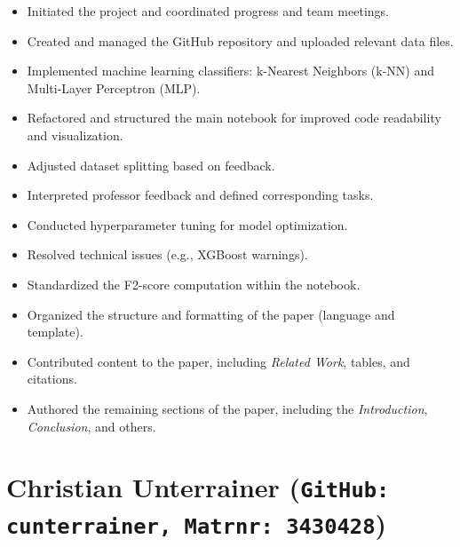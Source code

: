 \documentclass[11pt,a4paper]{article}
\begin{document}
\begin{itemize}[leftmargin=1.5em]
    \item Initiated the project and coordinated progress and team meetings.
    \item Created and managed the GitHub repository and uploaded relevant data files.
    \item Implemented machine learning classifiers: k-Nearest Neighbors (k-NN) and Multi-Layer Perceptron (MLP).
    \item Refactored and structured the main notebook for improved code readability and visualization.
    \item Adjusted dataset splitting based on feedback.
    \item Interpreted professor feedback and defined corresponding tasks.
    \item Conducted hyperparameter tuning for model optimization.
    \item Resolved technical issues (e.g., XGBoost warnings).
    \item Standardized the F2-score computation within the notebook.
    \item Organized the structure and formatting of the paper (language and template).
    \item Contributed content to the paper, including \textit{Related Work}, tables, and citations.
    \item Authored the remaining sections of the paper, including the \textit{Introduction}, \textit{Conclusion}, and others.
\end{itemize}

\section*{Christian Unterrainer (\texttt{GitHub: cunterrainer, Matrnr: 3430428})}
\end{document}
